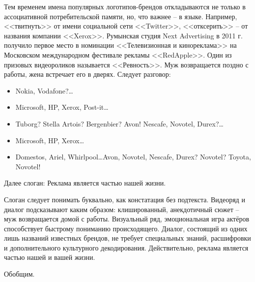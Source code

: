 Тем временем имена популярных логотипов-брендов откладываются не только в ассоциативной
потребительской памяти, но, что важнее -- в языке.  Например,  <<твитнуть>> от имени социальной сети
<<Twitter>>, <<отксерить>> -- от названия компании <<Xerox>>. Румынская студия Next Advertising в 2011
г. получило первое место в номинации <<Телевизионная и кинореклама>> на Московском международном
фестивале рекламы <<RedApple>>. Один из призовых видеороликов называется <<Ревность>>. Муж возвращается
поздно с работы, жена встречает его в дверях. Следует разговор:
\begin{itemize}
\item Nokia, Vodafone?\ldots
\item Microsoft, HP, Xerox, Post-it\ldots
\item Tuborg? Stella Artois? Bergenbier? Avon! Nescafe, Novotel, Durex?\ldots
\item Microsoft, HP, Xerox\ldots
\item Domestos, Ariel, Whirlpool\ldots Avon, Novotel, Nescafe, Durex? Novotel? Toyota, Novotel!
\end{itemize}

Далее слоган: Реклама является частью нашей жизни.

Слоган следует понимать буквально, как констатация без подтекста. Видеоряд и диалог подсказывают
каким образом:  клишированный, анекдотичный сюжет -- муж возвращается домой с работы. Визуальный ряд,
эмоциональная игра актёров способствует быстрому пониманию происходящего. Диалог, состоящий из одних
лишь названий известных брендов, не требует специальных знаний, расшифровки и дополнительного
культурного декодирования. Действительно, реклама является частью нашей и вашей жизни.

Обобщим.

